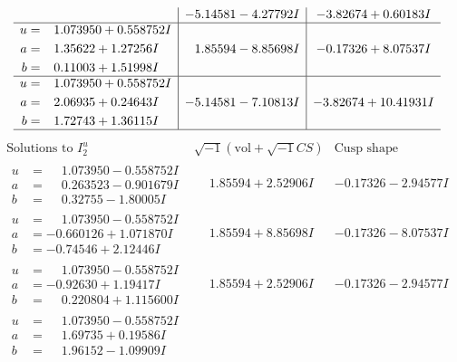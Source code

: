 \documentclass[1p]{elsarticle_modified}
\theoremstyle{definition}
\newcommand{\I}{\sqrt{-1}}
\begin{document}
$$\begin{array}{c|c|c}
 & -5.14581 - 4.27792 I & -3.82674 + 0.60183 I \\ \hline\begin{aligned}
u &= \phantom{-}1.073950 + 0.558752 I \\
a &= \phantom{-}1.35622 + 1.27256 I \\
b &= \phantom{-}0.11003 + 1.51998 I\end{aligned}
 & \phantom{-}1.85594 - 8.85698 I & -0.17326 + 8.07537 I \\ \hline\begin{aligned}
u &= \phantom{-}1.073950 + 0.558752 I \\
a &= \phantom{-}2.06935 + 0.24643 I \\
b &= \phantom{-}1.72743 + 1.36115 I\end{aligned}
 & -5.14581 - 7.10813 I & -3.82674 + 10.41931 I\\
 \hline 
 \end{array}$$\newpage$$\begin{array}{c|c|c}  
\text{Solutions to }I^u_{2}& \I (\text{vol} + \sqrt{-1}CS) & \text{Cusp shape}\\
 \hline 
\begin{aligned}
u &= \phantom{-}1.073950 - 0.558752 I \\
a &= \phantom{-}0.263523 - 0.901679 I \\
b &= \phantom{-}0.32755 - 1.80005 I\end{aligned}
 & \phantom{-}1.85594 + 2.52906 I & -0.17326 - 2.94577 I \\ \hline\begin{aligned}
u &= \phantom{-}1.073950 - 0.558752 I \\
a &= -0.660126 + 1.071870 I \\
b &= -0.74546 + 2.12446 I\end{aligned}
 & \phantom{-}1.85594 + 8.85698 I & -0.17326 - 8.07537 I \\ \hline\begin{aligned}
u &= \phantom{-}1.073950 - 0.558752 I \\
a &= -0.92630 + 1.19417 I \\
b &= \phantom{-}0.220804 + 1.115600 I\end{aligned}
 & \phantom{-}1.85594 + 2.52906 I & -0.17326 - 2.94577 I \\ \hline\begin{aligned}
u &= \phantom{-}1.073950 - 0.558752 I \\
a &= \phantom{-}1.69735 + 0.19586 I \\
b &= \phantom{-}1.96152 - 1.09909 I\end{aligned}

\end{array}$$
\end{document}
